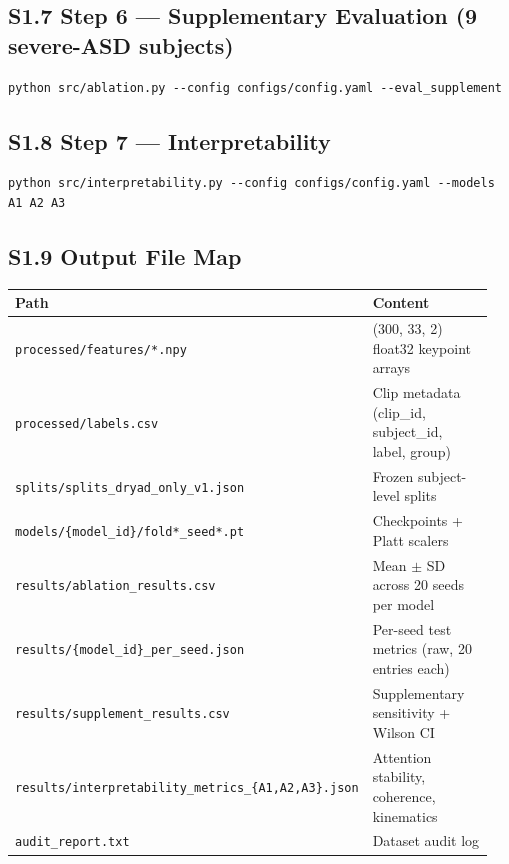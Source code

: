 \documentclass[12pt,a4paper]{article}
\begin{document}
\subsection{S1.7 Step 6 --- Supplementary Evaluation (9 severe-ASD subjects)}

\begin{verbatim}
python src/ablation.py --config configs/config.yaml --eval_supplement
\end{verbatim}

\subsection{S1.8 Step 7 --- Interpretability}

\begin{verbatim}
python src/interpretability.py --config configs/config.yaml --models A1 A2 A3
\end{verbatim}

\subsection{S1.9 Output File Map}

\begin{longtable}{@{}p{0.40\linewidth} p{0.55\linewidth}@{}}
\toprule
Path & Content \\
\midrule
\texttt{processed/features/*.npy} & (300, 33, 2) float32 keypoint arrays \\
\texttt{processed/labels.csv} & Clip metadata (clip\_id, subject\_id, label, group) \\
\texttt{splits/splits\_dryad\_only\_v1.json} & Frozen subject-level splits \\
\texttt{models/\{model\_id\}/fold*\_seed*.pt} & Checkpoints + Platt scalers \\
\texttt{results/ablation\_results.csv} & Mean $\pm$ SD across 20 seeds per model \\
\texttt{results/\{model\_id\}\_per\_seed.json} & Per-seed test metrics (raw, 20 entries each) \\
\texttt{results/supplement\_results.csv} & Supplementary sensitivity + Wilson CI \\
\texttt{results/interpretability\_metrics\_\{A1,A2,A3\}.json} & Attention stability, coherence, kinematics \\
\texttt{audit\_report.txt} & Dataset audit log \\
\bottomrule
\end{longtable}
\end{document}

